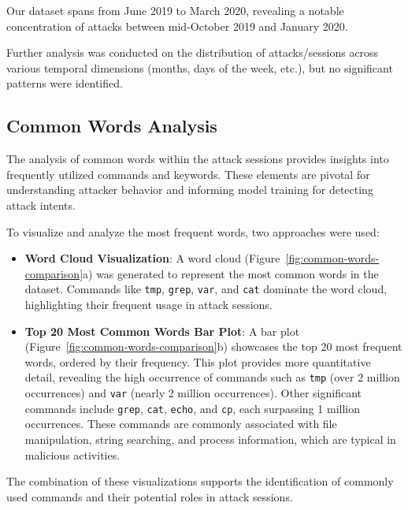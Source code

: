         Our dataset spans from June 2019 to March 2020, revealing a notable concentration of attacks between mid-October 2019 and January 2020.

        Further analysis was conducted on the distribution of attacks/sessions across various temporal dimensions (months, days of the week, etc.), but no significant patterns were identified.
        

    \subsection{Common Words Analysis}
    
        The analysis of common words within the attack sessions provides insights into frequently utilized commands and keywords. These elements are pivotal for understanding attacker behavior and informing model training for detecting attack intents. 

        To visualize and analyze the most frequent words, two approaches were used: 
        

        \begin{itemize}
            \item \textbf{Word Cloud Visualization}: A word cloud (Figure~\ref{fig:common-words-comparison}a) was generated to represent the most common words in the dataset. Commands like \texttt{tmp}, \texttt{grep}, \texttt{var}, and \texttt{cat} dominate the word cloud, highlighting their frequent usage in attack sessions.

            \item \textbf{Top 20 Most Common Words Bar Plot}: A bar plot (Figure~\ref{fig:common-words-comparison}b) showcases the top 20 most frequent words, ordered by their frequency. This plot provides more quantitative detail, revealing the high occurrence of commands such as \texttt{tmp} (over 2 million occurrences) and \texttt{var} (nearly 2 million occurrences). Other significant commands include \texttt{grep}, \texttt{cat}, \texttt{echo}, and \texttt{cp}, each surpassing 1 million occurrences. These commands are commonly associated with file manipulation, string searching, and process information, which are typical in malicious activities.
        \end{itemize}

        The combination of these visualizations supports the identification of commonly used commands and their potential roles in attack sessions. 

